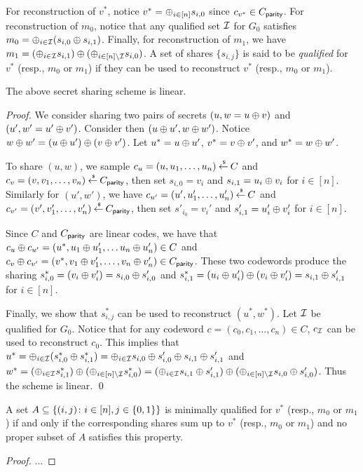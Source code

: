 For reconstruction of $v^*$, notice $v^* = \oplus_{i \in [n]} s_{i,0}$ since $c_{v^*} \in C_{\mathsf{parity}}$.
For reconstruction of $m_0$, notice that any qualified set ${\mathcal I}$ for $G_0$ satisfies $m_0 = \oplus_{i \in {\mathcal I}} (s_{i,0} \oplus s_{i,1})$.
Finally, for reconstruction of $m_1$, we have $m_1 = (\oplus_{i \in {\mathcal I}} s_{i,1})\oplus(\oplus_{i \in [n]\setminus {\mathcal I}} s_{i,0})$.
A set of shares $\{s_{i,j}\}$ is said to be {\em qualified} for $v^*$ (resp., $m_0$ or $m_1$) if they can be used to reconstruct $v^*$ (resp., $m_0$ or $m_1$).
\begin{myclaim}
	The above secret sharing scheme is linear.
\end{myclaim}
\begin{proof}
	We consider sharing two pairs of secrets $(u, w = u \oplus v)$ and $(u', w' = u' \oplus v')$.
	Consider then $(u\oplus u', w\oplus w')$.
	Notice $w\oplus w' = (u \oplus u') \oplus (v \oplus v')$.
	Let $u^* = u\oplus u'$, $v^* = v\oplus v'$, and $w^* = w\oplus w'$.
	
	To share $(u,w)$, we sample $c_u = (u, u_1,\dotsc, u_n) \mathbin{\stackrel{\mbox{\,\tiny \$}}{\gets}} C$ and $c_v = (v,v_1,\dotsc, v_n) \mathbin{\stackrel{\mbox{\,\tiny \$}}{\gets}} C_\mathsf{parity}$, then set $s_{i,0} = v_i$ and $s_{i,1} = u_i\oplus v_i$ for $i \in [n]$.
	Similarly for $(u',w')$, we have $c_{u'} = (u',u_1',\dotsc,u_n') \mathbin{\stackrel{\mbox{\,\tiny \$}}{\gets}} C$ and $c_{v'} = (v',v_1',\dotsc,v_n') \mathbin{\stackrel{\mbox{\,\tiny \$}}{\gets}} C_\mathsf{parity}$, then set $s'_{i_0} = v_i'$ and $s'_{i,1} = u_i' \oplus v_i'$ for $i \in [n]$.
	
	Since $C$ and $C_\mathsf{parity}$ are linear codes, we have that $c_u \oplus c_{u'} = (u^*, u_1\oplus u_1',\dotsc u_n \oplus u_n') \in C$ and $c_v \oplus c_{v'} = (v^*, v_1 \oplus v_1',\dotsc, v_n \oplus v_n') \in C_\mathsf{parity}$.
	These two codewords produce the sharing $s^*_{i,0} = (v_i\oplus v_i') = s_{i,0}\oplus s_{i,0}'$ and $s^*_{i,1} = (u_i\oplus u_i') \oplus (v_i \oplus v_i') = s_{i,1}\oplus s_{i,1}'$ for $i \in [n]$.
	
	Finally, we show that $s^*_{i,j}$ can be used to reconstruct $(u^*, w^*)$.
	Let ${\mathcal I}$ be qualified for $G_0$.
	Notice that for any codeword $c = (c_0, c_1,\dotsc,c_n) \in C$, $c_{\mathcal I}$ can be used to reconstruct $c_0$.
	This implies that $u^* = \oplus_{i \in {\mathcal I}} (s_{i,0}^* \oplus s_{i,1}^*) = \oplus_{i \in {\mathcal I}} s_{i,0}\oplus s_{i,0}' \oplus s_{i,1}\oplus s_{i,1}'$ and $w^* = (\oplus_{i \in {\mathcal I}} s^*_{i,1})\oplus (\oplus_{i \in [n]\setminus {\mathcal I}}s_{i,0}^*) = (\oplus_{i \in {\mathcal I}} s_{i,1}\oplus s'_{i,1}) \oplus (\oplus_{i \in [n]\setminus {\mathcal I}}s_{i,0}\oplus s_{i,0}')$.
	Thus the scheme is linear. \qed
\end{proof}

\begin{myclaim}\label{clm:min-secret}
	A set $A \subseteq \{(i,j)\colon i \in [n], j \in {\{0,1\}} \}$ is minimally qualified for $v^*$ (resp., $m_0$ or $m_1$) if and only if the corresponding shares sum up to $v^*$ (resp., $m_0$ or $m_1$) and no proper subset of $A$ satisfies this property.
\end{myclaim}
\begin{proof}
	...
\end{proof}


